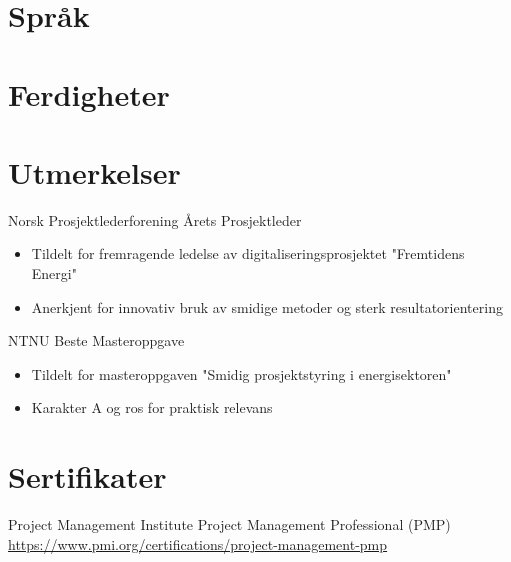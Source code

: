 \documentclass[a4paper, serif, 10pt]{moderncv}
\begin{document}
\section{Språk}

\section{Ferdigheter}

\section{Utmerkelser}

        {Norsk Prosjektlederforening}
        {Årets Prosjektleder}
        {}
        {}
        {\begin{itemize}
\item Tildelt for fremragende ledelse av digitaliseringsprosjektet "Fremtidens Energi"
\item Anerkjent for innovativ bruk av smidige metoder og sterk resultatorientering
\end{itemize}}

        {NTNU}
        {Beste Masteroppgave}
        {}
        {}
        {\begin{itemize}
\item Tildelt for masteroppgaven "Smidig prosjektstyring i energisektoren"
\item Karakter A og ros for praktisk relevans
\end{itemize}}
\section{Sertifikater}

        {Project Management Institute}
        {Project Management Professional (PMP)}
        {\url{https://www.pmi.org/certifications/project-management-pmp}}
        {}
        {}
\end{document}
